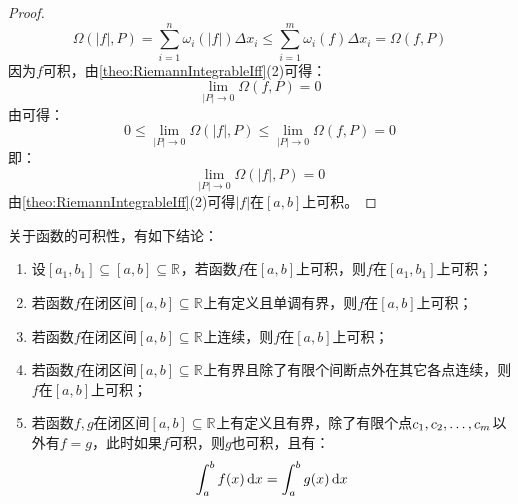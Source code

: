 \begin{proof}
	\begin{equation*}
		\Omega(|f|,P)=\sum_{i=1}^{n}\omega_i(|f|)\Delta x_i\leqslant\sum_{i=1}^{m}\omega_i(f)\Delta x_i=\Omega(f,P)
	\end{equation*}
	因为$f$可积，由\cref{theo:RiemannIntegrableIff}(2)可得：
	\begin{equation*}
		\lim_{|P|\to0}\Omega(f,P)=0
	\end{equation*}
	由可得：
	\begin{equation*}
		0\leqslant\lim_{|P|\to0}\Omega(|f|,P)\leqslant\lim_{|P|\to0}\Omega(f,P)=0
	\end{equation*}
	即：
	\begin{equation*}
		\lim_{|P|\to0}\Omega\left(|f|,P\right)=0
	\end{equation*}
	由\cref{theo:RiemannIntegrableIff}(2)可得$|f|$在$[a,b]$上可积。
\end{proof}
\begin{theorem}
	关于函数的可积性，有如下结论：
	\begin{enumerate}
		\item 设$[a_1,b_1]\subseteq[a,b]\subseteq\mathbb{R}^{}$，若函数$f$在$[a,b]$上可积，则$f$在$[a_1,b_1]$上可积；
		\item 若函数$f$在闭区间$[a,b]\subseteq\mathbb{R}^{}$上有定义且单调有界，则$f$在$[a,b]$上可积；
		\item 若函数$f$在闭区间$[a,b]\subseteq\mathbb{R}^{}$上连续，则$f$在$[a,b]$上可积；
		\item 若函数$f$在闭区间$[a,b]\subseteq\mathbb{R}^{}$上有界且除了有限个间断点外在其它各点连续，则$f$在$[a,b]$上可积；
		\item 若函数$f,g$在闭区间$[a,b]\subseteq\mathbb{R}^{}$上有定义且有界，除了有限个点$c_1, c_2, \dots, c_{m}$以外有$f=g$，此时如果$f$可积，则$g$也可积，且有：
		\begin{equation*}
			\int_{a}^bf(x)\mathop{}\!\mathrm{d} x=\int_{a}^bg(x)\mathop{}\!\mathrm{d} x
		\end{equation*}
	\end{enumerate}
\end{theorem}
